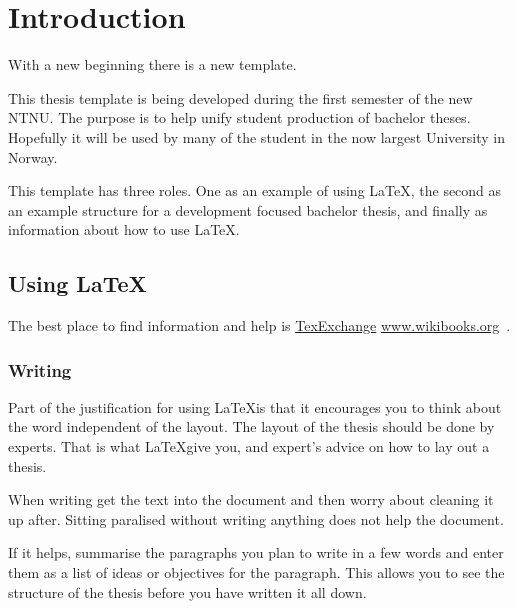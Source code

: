 \chapter{Introduction}
\label{chap:introduction}

With a new beginning there is a new template.  

This thesis template is being developed during the first semester of the new NTNU. The purpose is to help unify student production of bachelor theses.  Hopefully it will be used by many of the student in the now largest University in Norway.

This template has three roles.  One as an example of using \LaTeX, the second as an example structure for a development focused bachelor thesis, and finally as information about how to use \LaTeX.

\section{Using \LaTeX}
The best place to find information and help is \href{http://www.wikibooks.org}{TexExchange} \url{www.wikibooks.org}~\cite{texexchange}.

\subsection{Writing}
Part of the justification for using \LaTeX is that it encourages you to think about the word independent of the layout. The layout of the thesis should be done by experts. That is what \LaTeX give you, and expert's advice on how to lay out a thesis. 

When writing get the text into the document and then worry about cleaning it up after. Sitting paralised without writing anything does not help the document.  

If it helps, summarise the paragraphs you plan to write in a few words and enter them as a list of ideas or objectives for the paragraph.  This allows you to see the structure of the thesis before you have written it all down.
